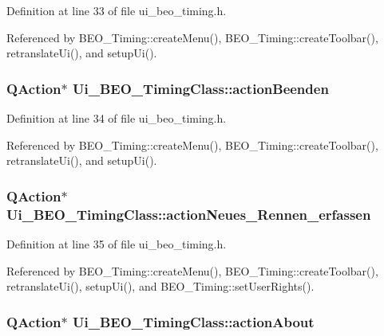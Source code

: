 Definition at line 33 of file ui\_\-beo\_\-timing.h.

Referenced by BEO\_\-Timing::createMenu(), BEO\_\-Timing::createToolbar(), retranslateUi(), and setupUi().\hypertarget{class_ui___b_e_o___timing_class_02af051353694da32aca2f3c4784b4f5}{
\subsubsection[actionBeenden]{\setlength{\rightskip}{0pt plus 5cm}QAction$\ast$ {\bf Ui\_\-BEO\_\-TimingClass::actionBeenden}}}
\label{class_ui___b_e_o___timing_class_02af051353694da32aca2f3c4784b4f5}




Definition at line 34 of file ui\_\-beo\_\-timing.h.

Referenced by BEO\_\-Timing::createMenu(), BEO\_\-Timing::createToolbar(), retranslateUi(), and setupUi().\hypertarget{class_ui___b_e_o___timing_class_9b18475876f8bdefc32029c20f03d2dc}{
\subsubsection[actionNeues\_\-Rennen\_\-erfassen]{\setlength{\rightskip}{0pt plus 5cm}QAction$\ast$ {\bf Ui\_\-BEO\_\-TimingClass::actionNeues\_\-Rennen\_\-erfassen}}}
\label{class_ui___b_e_o___timing_class_9b18475876f8bdefc32029c20f03d2dc}




Definition at line 35 of file ui\_\-beo\_\-timing.h.

Referenced by BEO\_\-Timing::createMenu(), BEO\_\-Timing::createToolbar(), retranslateUi(), setupUi(), and BEO\_\-Timing::setUserRights().\hypertarget{class_ui___b_e_o___timing_class_6729c44a373294e3a925a7e2410db678}{
\subsubsection[actionAbout]{\setlength{\rightskip}{0pt plus 5cm}QAction$\ast$ {\bf Ui\_\-BEO\_\-TimingClass::actionAbout}}}
\label{class_ui___b_e_o___timing_class_6729c44a373294e3a925a7e2410db678}




